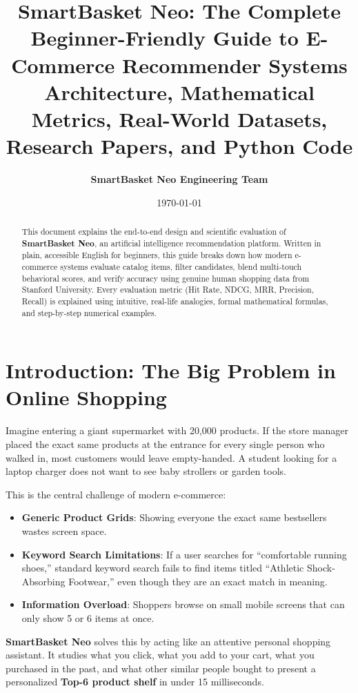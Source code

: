 \documentclass[11pt,a4paper]{article}
\title{\textbf{SmartBasket Neo: The Complete Beginner-Friendly Guide to E-Commerce Recommender Systems}\\
\large Architecture, Mathematical Metrics, Real-World Datasets, Research Papers, and Python Code}
\author{\textbf{SmartBasket Neo Engineering Team}}
\date{\today}
\begin{document}
\maketitle

\begin{abstract}
This document explains the end-to-end design and scientific evaluation of \textbf{SmartBasket Neo}, an artificial intelligence recommendation platform. Written in plain, accessible English for beginners, this guide breaks down how modern e-commerce systems evaluate catalog items, filter candidates, blend multi-touch behavioral scores, and verify accuracy using genuine human shopping data from Stanford University. Every evaluation metric (Hit Rate, NDCG, MRR, Precision, Recall) is explained using intuitive, real-life analogies, formal mathematical formulas, and step-by-step numerical examples.
\end{abstract}

\tableofcontents
\newpage

\section{Introduction: The Big Problem in Online Shopping}

Imagine entering a giant supermarket with 20,000 products. If the store manager placed the exact same products at the entrance for every single person who walked in, most customers would leave empty-handed. A student looking for a laptop charger does not want to see baby strollers or garden tools.

This is the central challenge of modern e-commerce:
\begin{itemize}[noitemsep]
    \item \textbf{Generic Product Grids}: Showing everyone the exact same bestsellers wastes screen space.
    \item \textbf{Keyword Search Limitations}: If a user searches for ``comfortable running shoes,'' standard keyword search fails to find items titled ``Athletic Shock-Absorbing Footwear,'' even though they are an exact match in meaning.
    \item \textbf{Information Overload}: Shoppers browse on small mobile screens that can only show 5 or 6 items at once.
\end{itemize}

\textbf{SmartBasket Neo} solves this by acting like an attentive personal shopping assistant. It studies what you click, what you add to your cart, what you purchased in the past, and what other similar people bought to present a personalized \textbf{Top-6 product shelf} in under 15 milliseconds.
\end{document}

